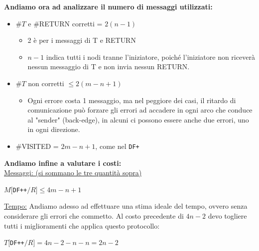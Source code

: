 \textbf{Andiamo ora ad analizzare il numero di messaggi utilizzati:}
\begin{itemize}
    \item \#$T$ e \#RETURN corretti = $2(n-1)$
          \begin{itemize}
              \item 2 è per i messaggi di T e RETURN
              \item $n-1$ indica tutti i nodi tranne l'iniziatore, poiché
                    l'iniziatore non riceverà nessun messaggio di T e non invia nessun
                    RETURN.
          \end{itemize}
    \item \#$T$ non corretti $\leq 2(m-n+1)$
          \begin{itemize}
              \item Ogni errore costa 1 messaggio, ma nel peggiore dei casi, il
                    ritardo di comunicazione può forzare gli errori ad accadere in ogni
                    arco che conduce al "sender" (back-edge), in alcuni ci possono essere
                    anche due errori, uno in ogni direzione.


          \end{itemize}

    \item \#VISITED = $2m - n + 1$, come nel \texttt{DF+}

\end{itemize}

\textbf{Andiamo infine a valutare i costi: }\\
\underline{Messaggi: (si sommano le tre quantità sopra)}
\begin{center}
    $M[$\texttt{DF++}$/R] \leq 4m - n + 1$
\end{center}

\underline{Tempo:}
Andiamo adesso ad effettuare una stima ideale del tempo, ovvero senza
considerare gli errori che commetto. Al costo precedente di $4n-2$ devo togliere
tutti i miglioramenti che applica questo protocollo:
\begin{center}
    $T[$\texttt{DF++}$/R] = 4n - 2 - n - n = 2n - 2$
\end{center}

